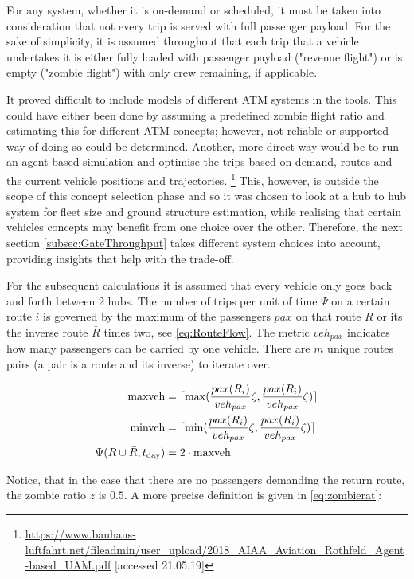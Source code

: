 For any system, whether it is on-demand or scheduled, it must be taken into consideration that not every trip is served with full passenger payload. For the sake of simplicity, it is assumed throughout that each trip that a vehicle undertakes it is either fully loaded with passenger payload ("revenue flight") or is empty ("zombie flight") with only crew remaining, if applicable.

It proved difficult to include models of different ATM systems in the tools. This could have either been done by assuming a predefined zombie flight ratio and estimating this for different ATM concepts; however, not reliable or supported way of doing so could be determined. Another, more direct way would be to run an agent based simulation and optimise the trips based on demand, routes and the current vehicle positions and trajectories. \footnote{\url{https://www.bauhaus-luftfahrt.net/fileadmin/user_upload/2018_AIAA_Aviation_Rothfeld_Agent-based_UAM.pdf} [accessed 21.05.19]} This, however, is outside the scope of this concept selection phase and so it was chosen to look at a hub to hub system for fleet size and ground structure estimation, while realising that certain vehicles concepts may benefit from one choice over the other. Therefore, the next section \ref{subsec:GateThroughput} takes different system choices into account, providing insights that help with the trade-off.

For the subsequent calculations it is assumed that every vehicle only goes back and forth between 2 hubs. The number of trips per unit of time $\Psi$ on a certain route $i$ is governed by the maximum of the passengers $pax$ on that route $R$ or its the inverse route $\bar{R}$ times two, see \autoref{eq:RouteFlow}. The metric $veh_{pax}$ indicates how many passengers can be carried by one vehicle. There are $m$ unique routes pairs (a pair is a route and its inverse) to iterate over.

\begin{align} \label{eq:RouteFlow}
    \text{maxveh} &= \lceil \max( \frac{pax(R_i)}{veh_{pax}} \zeta, \frac{pax(R_i)}{veh_{pax}}\zeta ) \rceil\\
    \text{minveh} &= \lceil \min( \frac{pax(R_i)}{veh_{pax}} \zeta, \frac{pax(R_i)}{veh_{pax}}\zeta ) \rceil\\
    \Psi(R\cup\bar{R}, t_{\text{day}}) &= 2\cdot \text{maxveh}
\end{align}

Notice, that in the case that there are no passengers demanding the return route, the zombie ratio $z$ is $0.5$. A more precise definition is given in \autoref{eq:zombierat}:

